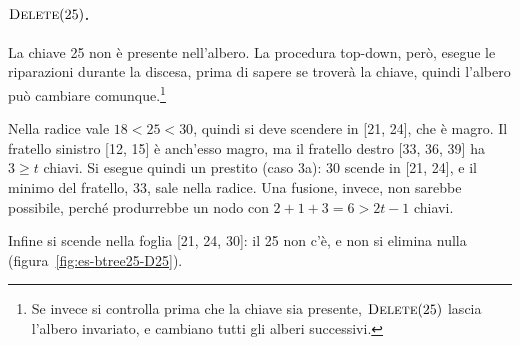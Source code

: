\paragraph{$\textsc{Delete}(25)$.}
La chiave 25 non è presente nell'albero. La procedura top-down, però, esegue le riparazioni durante la discesa, prima di sapere se troverà la chiave, quindi l'albero può cambiare comunque.\footnote{Se invece si controlla prima che la chiave sia presente, $\textsc{Delete}(25)$ lascia l'albero invariato, e cambiano tutti gli alberi successivi.}

Nella radice vale $18 < 25 < 30$, quindi si deve scendere in [21, 24], che è magro. Il fratello sinistro [12, 15] è anch'esso magro, ma il fratello destro [33, 36, 39] ha $3 \ge t$ chiavi. Si esegue quindi un prestito (caso 3a): 30 scende in [21, 24], e il minimo del fratello, 33, sale nella radice. Una fusione, invece, non sarebbe possibile, perché produrrebbe un nodo con $2 + 1 + 3 = 6 > 2t-1$ chiavi.

Infine si scende nella foglia [21, 24, 30]: il 25 non c'è, e non si elimina nulla (figura~\ref{fig:es-btree25-D25}).

